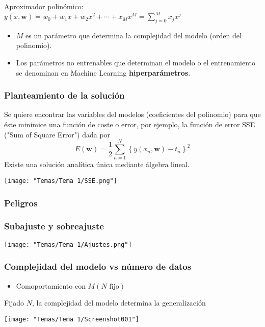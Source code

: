 Aproximador polinómico: $y(x,\mathbf{w})=w_0+w_1x+w_2x^2+\cdots+x_Mx^M=\sum_{j=0}^{M}x_jx^j$

\begin{itemize}
	\item $M$ es un parámetro que determina la complejidad del modelo (orden del polinomio).
	\item Los parámetros no entrenables que determinan el modelo o el entrenamiento se denominan en Machine Learning \textbf{hiperparámetros}.
\end{itemize}
\subsubsection{Planteamiento de la solución}
Se quiere encontrar las variables del modelos (coeficientes del polinomio) para que éste minimice una función de coste o error, por ejemplo, la función de error SSE ("Sum of Square Error") dada por \[ E(\mathbf{w})=\dfrac{1}{2}\sum_{n=1}^{N}\left\{y(x_n,\mathbf{w})-t_n\right\}^2 \]Existe una solución analítica única mediante álgebra lineal.


\begin{center}
	\texttt{[image: "Temas/Tema 1/SSE.png"]}
\end{center}

\subsubsection{Peligros}
\subsubsection{Subajuste y sobreajuste}

\begin{center}
	\texttt{[image: "Temas/Tema 1/Ajustes.png"]}
\end{center}
\subsubsection{Complejidad del modelo vs número de datos}
\begin{minipage}{0.6\textwidth}
	\begin{itemize}[label=\color{red}\textbullet, leftmargin=*]
		\item \color{lightblue}Comoportamiento con $M(N\text{ fijo})$
	\end{itemize}
	Fijado $N$, la complejidad del modelo determina la generalización
\end{minipage}\qquad\begin{minipage}{0.4\textwidth}
	\texttt{[image: "Temas/Tema 1/Screenshot001"]}
\end{minipage}

